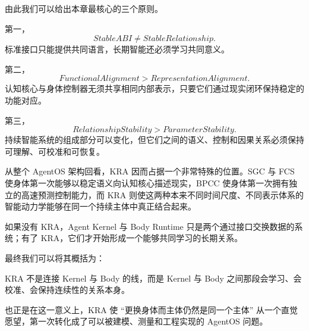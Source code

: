 由此我们可以给出本章最核心的三个原则。

第一，
\[
\boxed{
StableABI
\neq
StableRelationship.
}
\]
标准接口只能提供共同语言，长期智能还必须学习共同意义。

第二，
\[
\boxed{
FunctionalAlignment
>
RepresentationAlignment.
}
\]
认知核心与身体控制器无须共享相同内部表示，只要它们通过现实闭环保持稳定的功能对应。

第三，
\[
\boxed{
RelationshipStability
>
ParameterStability.
}
\]
持续智能系统的组成部分可以变化，但它们之间的语义、控制和因果关系必须保持可理解、可校准和可恢复。

从整个 AgentOS 架构回看，KRA 因而占据一个非常特殊的位置。SGC 与 FCS 使身体第一次能够以稳定语义向认知核心描述现实，BPCC 使身体第一次拥有独立的高速预测控制能力，而 KRA 则使这两种本来不同时间尺度、不同表示体系的智能动力学能够在同一个持续主体中真正结合起来。

如果没有 KRA，Agent Kernel 与 Body Runtime 只是两个通过接口交换数据的系统；有了 KRA，它们才开始形成一个能够共同学习的长期关系。

最终我们可以将其概括为：
\begin{conclusion}
KRA 不是连接 Kernel 与 Body 的线，而是 Kernel 与 Body 之间那段会学习、会校准、会保持连续性的关系本身。
\end{conclusion}

也正是在这一意义上，KRA 使 ``更换身体而主体仍然是同一个主体'' 从一个直觉愿望，第一次转化成了可以被建模、测量和工程实现的 AgentOS 问题。
